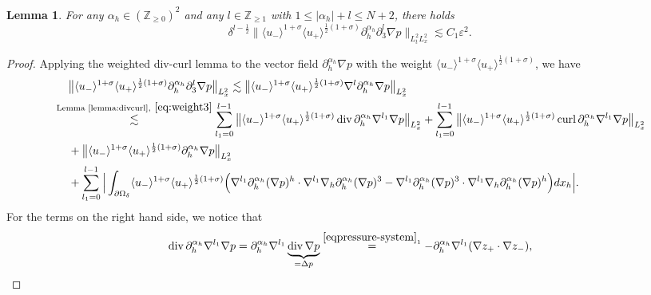 \documentclass[10pt,reqno]{amsart}
\numberwithin{equation}{section}
\newtheorem{lemma}[theorem]{Lemma}
\begin{document}
\begin{lemma}\label{lemma:HH}
For any $\alpha_h\in(\mathbb{Z}_{\geqslant 0})^2$ and any $l\in\mathbb{Z}_{\geqslant 1}$ with 
	$1\leqslant
	|\alpha_h|+l\leqslant N+2$, there holds 
	\begin{equation*}
		\delta^{l-\frac{1}{2}}\big\|\langle u_-\rangle^{1+\sigma}\langle u_+\rangle^{\frac{1}{2}(1+\sigma)}\partial_{h}^{\alpha_h}\partial_3^l \nabla p\big\|_{L^2_tL^2_x}
		\lesssim C_1\varepsilon^2.
	\end{equation*}
\end{lemma}
\begin{proof}
Applying the weighted div-curl lemma to  the vector field $\partial_{h}^{\alpha_h}\nabla p$ with the weight $\langle u_-\rangle^{1+\sigma}\langle u_+\rangle^{\frac{1}{2}(1+\sigma)}$, we have 
	\begin{align*}
		&\ \ \ \ \big\|\langle u_-\rangle^{1+\sigma}\langle u_+\rangle^{\frac{1}{2}(1+\sigma)}\partial_{h}^{\alpha_h}\partial_3^l \nabla p\big\|_{L^2_x}
			\lesssim \big\|\langle u_-\rangle^{1+\sigma}\langle u_+\rangle^{\frac{1}{2}(1+\sigma)}\nabla^l \partial_h^{\alpha_h}\nabla p\big\|_{L^2_x}\\
			&\stackrel{\text{Lemma \ref{lemma:divcurl}},\  \eqref{eq:weight3}}{\lesssim}
		\sum_{l_1=0}^{l-1} \big\|\langle u_-\rangle^{1+\sigma}\langle u_+\rangle^{\frac{1}{2}(1+\sigma)}\operatorname{div}\partial_h^{\alpha_h}\nabla^{l_1} \nabla p\big\|_{L^2_x}+\sum_{l_1=0}^{l-1} \big\|\langle u_-\rangle^{1+\sigma}\langle u_+\rangle^{\frac{1}{2}(1+\sigma)}\operatorname{curl}\partial_h^{\alpha_h}\nabla^{l_1} \nabla p\big\|_{L^2_x}\\
		&\ \ \ \  
		+\big\|\langle u_-\rangle^{1+\sigma}\langle u_+\rangle^{\frac{1}{2}(1+\sigma)}\partial_h^{\alpha_h}\nabla p\big\|_{L^2_x}\\
		&\ \ \ \  
		 +\sum_{l_1=0}^{l-1}\Big|\int_{\partial\Omega_{\delta}}\langle u_-\rangle^{1+\sigma}\langle u_+\rangle^{\frac{1}{2}(1+\sigma)}\Big(\nabla^{l_1}\partial_h^{\alpha_h}(\nabla p)^h\cdot \nabla^{l_1}\nabla_h\partial_h^{\alpha_h}(\nabla p)^3-\nabla^{l_1}\partial_h^{\alpha_h}(\nabla p)^3\cdot \nabla^{l_1}\nabla_h\partial_h^{\alpha_h}(\nabla p)^h\Big)dx_h\Big|.
	\end{align*}
For the terms on the right hand side, we notice that 
\begin{align*}
&\operatorname{div}\partial_h^{\alpha_h}\nabla^{l_1} \nabla p=\partial_h^{\alpha_h}\nabla^{l_1}\underbrace{\operatorname{div}\nabla p}_{=\Delta p} 
\stackrel{\eqref{eqpressure-system}_1}{=}-\partial_h^{\alpha_h}\nabla^{l_1}(\nabla z_+\cdot \nabla z_-),\\

\end{align*}
\end{proof}
\end{document}
